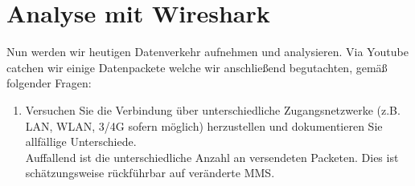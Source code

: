\documentclass[11pt]{article}
\begin{document}
    \section{Analyse mit Wireshark}
    Nun werden wir heutigen Datenverkehr aufnehmen und analysieren. Via Youtube catchen wir
    einige Datenpackete welche wir anschließend begutachten, gemäß folgender Fragen:

    \begin{enumerate}
        \item Versuchen Sie die Verbindung über unterschiedliche Zugangsnetzwerke (z.B. LAN, WLAN, 3/4G sofern möglich) herzustellen und dokumentieren Sie allfällige Unterschiede.\\
        Auffallend ist die unterschiedliche Anzahl an versendeten Packeten. Dies ist schätzungsweise rückführbar auf veränderte MMS.\\


\end{enumerate}
\end{document}
